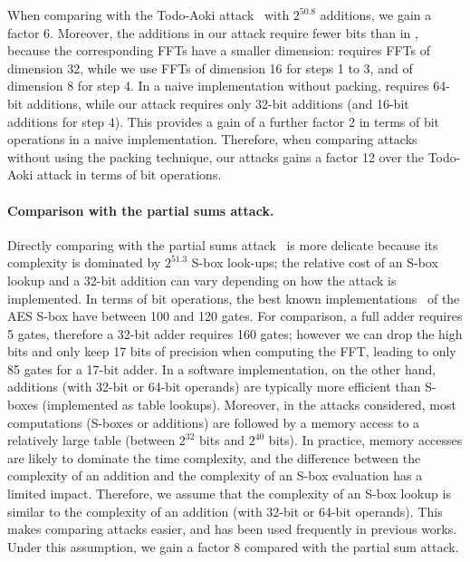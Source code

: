 When comparing with the Todo-Aoki attack~\cite{CANS:TodAok14} with
$2^{50.8}$ additions, we gain a factor 6.  Moreover, the additions in
our attack require fewer bits than in \cite{CANS:TodAok14}, because the
corresponding FFTs have a smaller dimension: \cite{CANS:TodAok14}
requires FFTs of dimension 32, while we use FFTs of dimension 16 for
steps 1 to 3, and of dimension 8 for step 4.  In a naive implementation
without packing, \cite{CANS:TodAok14} requires 64-bit additions, while
our attack requires only 32-bit additions (and 16-bit additions for step
4).  This provides a gain of a further factor 2 in terms of bit operations in
a naive implementation.  Therefore, when comparing attacks without using
the packing technique, our attacks gains a factor 12 over the Todo-Aoki
attack in terms of bit operations.

\paragraph{Comparison with the partial sums attack.}

Directly comparing with the partial sums attack~\cite{FSE:FKLSSWW00} is more
delicate because its complexity is dominated by $2^{51.3}$ S-box look-ups; the
relative cost of an S-box lookup and a 32-bit addition can vary depending on
how the attack is implemented.
In terms of bit operations, the best known implementations~\cite{TCHES:MaxEkd19}
of the AES S-box have between 100 and 120 gates.  For comparison, a
full adder requires 5 gates, therefore a 32-bit adder requires 160 gates; however
we can drop the high bits and only keep 17 bits of precision when computing the FFT,
leading to only 85 gates for a 17-bit adder.
In a software implementation, on the other hand, additions (with 32-bit or 64-bit operands) are typically
more efficient than S-boxes (implemented as table lookups).
Moreover, in the attacks considered, most computations (S-boxes or additions) are
followed by a memory access to a relatively large table (between $2^{32}$
bits and $2^{40}$ bits).  In practice, memory accesses
are likely to dominate the time complexity, and the difference between the complexity
of an addition and the complexity of an S-box evaluation has a limited impact.
Therefore, we assume that the complexity of an S-box lookup is
similar to the complexity of an addition (with 32-bit or 64-bit operands).
This makes comparing attacks easier, and has been used frequently in previous works.
Under this assumption, we gain a
factor 8 compared with the partial sum attack.

